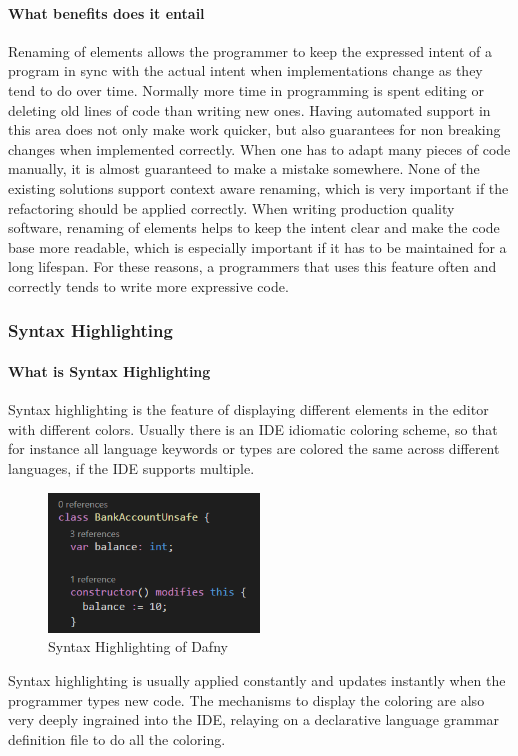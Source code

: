 \paragraph{What benefits does it entail}
Renaming of elements allows the programmer to keep the expressed intent of a program in sync with the actual intent when implementations change as they tend to do over time. Normally more time in programming is spent editing or deleting old lines of code than writing new ones. Having automated support in this area does not only make work quicker, but also guarantees for non breaking changes when implemented correctly. When one has to adapt many pieces of code manually, it is almost guaranteed to make a mistake somewhere. \newline
None of the existing solutions support context aware renaming, which is very important if the refactoring should be applied correctly. When writing production quality software, renaming of elements helps to keep the intent clear and make the code base more readable, which is especially important if it has to be maintained for a long lifespan. For these reasons, a programmers that uses this feature often and correctly tends to write more expressive code.

\subsubsection{Syntax Highlighting} \label{agsyntaxhighlighting}
\paragraph{What is Syntax Highlighting}
Syntax highlighting is the feature of displaying different elements in the editor with different colors. Usually there is an IDE idiomatic coloring scheme, so that for instance all language keywords or types are colored the same across different languages, if the IDE supports multiple. \newline
\begin{figure}[H]
	\centering
	\includegraphics[width=0.5\textwidth]{img/syntaxHighlighting}
	\caption{Syntax Highlighting of Dafny}
	\label{fig:agsyntaxHighlighting}
\end{figure}
Syntax highlighting is usually applied constantly and updates instantly when the programmer types new code. The mechanisms to display the coloring are also very deeply ingrained into the IDE, relaying on a declarative language grammar definition file to do all the coloring. 

